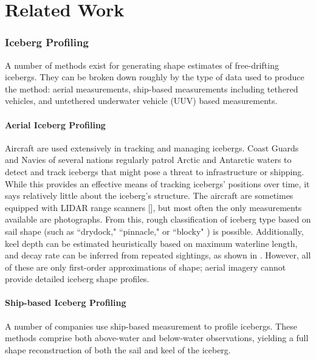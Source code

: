 
\chapter{Related Work}
\label{ch.RelatedWork}

\subsection{Iceberg Profiling}

A number of methods exist for generating shape estimates of free-drifting icebergs. They can be broken down roughly by the type of data used to produce the method: aerial measurements, ship-based measurements including tethered vehicles, and untethered underwater vehicle (UUV) based measurements.

\subsubsection{Aerial Iceberg Profiling}

Aircraft are used extensively in tracking and managing icebergs. Coast Guards and Navies of several nations regularly patrol Arctic and Antarctic waters to detect and track icebergs that might pose a threat to infrastructure or shipping. While this provides an effective means of tracking icebergs' positions over time, it says relatively little about the iceberg's structure. The aircraft are sometimes equipped with LIDAR range scanners [\cite{?}], but most often the only measurements available are photographs. From this, rough classification of iceberg type based on sail shape (such as ``drydock," ``pinnacle," or ``blocky" ) is possible. Additionally, keel depth can be estimated heuristically based on maximum waterline length, and decay rate can be inferred from repeated sightings, as shown in \cite{OceansLTD2004}. However, all of these are only first-order approximations of shape; aerial imagery cannot provide detailed iceberg shape profiles. 

\subsubsection{Ship-based Iceberg Profiling}

A number of companies use ship-based measurement to profile icebergs. These methods comprise both above-water and below-water observations, yielding a full shape reconstruction of both the sail and keel of the iceberg. 

